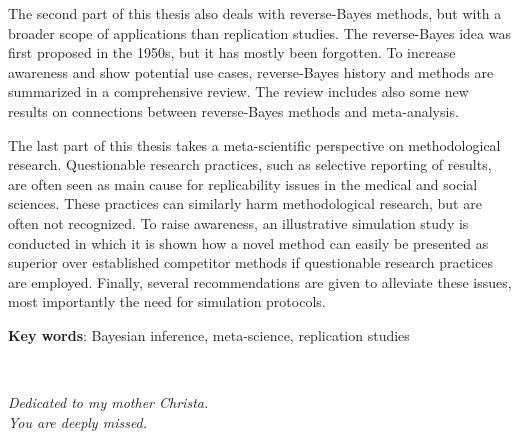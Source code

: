 The second part of this thesis also deals with reverse-Bayes methods, but with a
broader scope of applications than replication studies. The reverse-Bayes idea
was first proposed in the 1950s, but it has mostly been forgotten. To increase
awareness and show potential use cases, reverse-Bayes history and methods are
summarized in a comprehensive review. The review includes also some new results
on connections between reverse-Bayes methods and meta-analysis. %

The last part of this thesis takes a meta-scientific perspective on
methodological research. Questionable research practices, such as selective
reporting of results, are often seen as main cause for replicability issues in
the medical and social sciences. These practices can similarly harm
methodological research, but are often not recognized. To raise awareness, an
illustrative simulation study is conducted in which it is shown how a novel
method can easily be presented as superior over established competitor methods
if questionable research practices are employed. Finally, several
recommendations are given to alleviate these issues, most importantly the need
for simulation protocols.


\textbf{Key words}: Bayesian inference, meta-science, replication studies


\newpage ~

\newpage



\begin{center}
  \vspace*{5cm}

  \textit{Dedicated to my mother Christa. \\
    You are deeply missed.}
\end{center}
